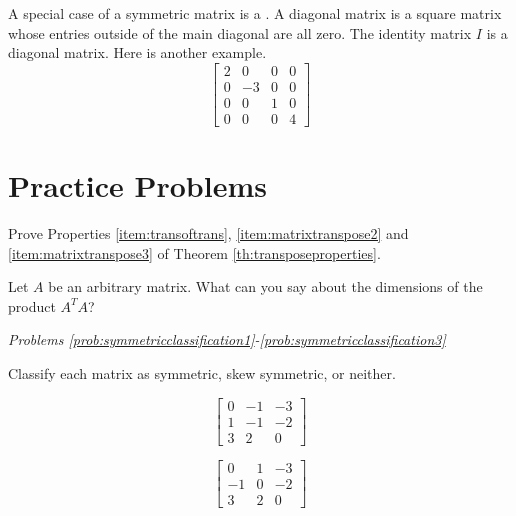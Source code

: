 \documentclass{ximera}
\begin{document}
A special case of a symmetric matrix is a .  A diagonal matrix is a square matrix whose entries outside of the main diagonal are all zero.  The identity matrix $I$ is a diagonal matrix.  Here is another example.
$$\begin{bmatrix}2&0&0&0\\0&-3&0&0\\0&0&1&0\\0&0&0&4\end{bmatrix}$$

\section*{Practice Problems}


\begin{problem}\label{prob:transpropsproofs} Prove Properties \ref{item:transoftrans}, \ref{item:matrixtranspose2} and \ref{item:matrixtranspose3} of Theorem \ref{th:transposeproperties}.
\end{problem}

\begin{problem}\label{prob:ATtimesAdimensions} Let $A$ be an arbitrary matrix.  What can you say about the dimensions of the product $A^TA$?
\end{problem}

\emph{Problems \ref{prob:symmetricclassification1}-\ref{prob:symmetricclassification3}}

Classify each matrix as symmetric, skew symmetric, or neither.

\begin{problem}\label{prob:symmetricclassification1}
$$\begin{bmatrix}
0 & -1 & -3\\
1 & -1 & -2\\
3 &  2 &  0
\end{bmatrix}$$
\begin{multipleChoice}
   \end{multipleChoice}
\end{problem}

\begin{problem}\label{prob:symmetricclassification2}
$$\begin{bmatrix}
0 & 1 & -3\\
-1 & 0 & -2\\
3 &  2 &  0
\end{bmatrix}$$
\begin{multipleChoice}
   \end{multipleChoice}
\end{problem}
\end{document}
